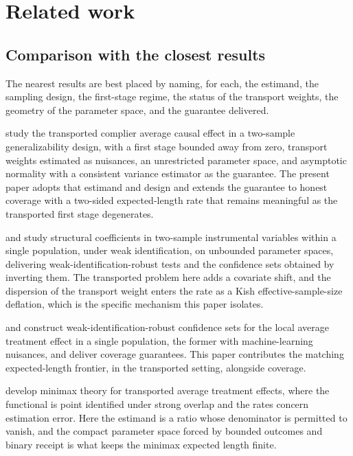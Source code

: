 \documentclass[11pt]{article}
\begin{document}
\section{Related work}

\subsection{Comparison with the closest results}

The nearest results are best placed by naming, for each, the estimand, the sampling design, the
first-stage regime, the status of the transport weights, the geometry of the parameter space, and the
guarantee delivered.

\citet{ChenHuang2025} study the transported complier average causal effect in a two-sample
generalizability design, with a first stage bounded away from zero, transport weights estimated as
nuisances, an unrestricted parameter space, and asymptotic normality with a consistent variance
estimator as the guarantee. The present paper adopts that estimand and design and extends the
guarantee to honest coverage with a two-sided expected-length rate that remains meaningful as the
transported first stage degenerates.

\citet{ChoiGuShen2018} and \citet{ChoiShen2019} study structural coefficients in two-sample
instrumental variables within a single population, under weak identification, on unbounded parameter
spaces, delivering weak-identification-robust tests and the confidence sets obtained by inverting them.
The transported problem here adds a covariate shift, and the dispersion of the transport weight enters
the rate as a Kish effective-sample-size deflation, which is the specific mechanism this paper isolates.

\citet{Ma2023} and \citet{SmuclerLanniMasip2025} construct weak-identification-robust confidence sets
for the local average treatment effect in a single population, the former with machine-learning
nuisances, and deliver coverage guarantees. This paper contributes the matching expected-length
frontier, in the transported setting, alongside coverage.

\citet{ZengKennedyBodnarNaimi2024} develop minimax theory for transported average treatment effects,
where the functional is point identified under strong overlap and the rates concern estimation error.
Here the estimand is a ratio whose denominator is permitted to vanish, and the compact parameter space
forced by bounded outcomes and binary receipt is what keeps the minimax expected length finite.
\end{document}
